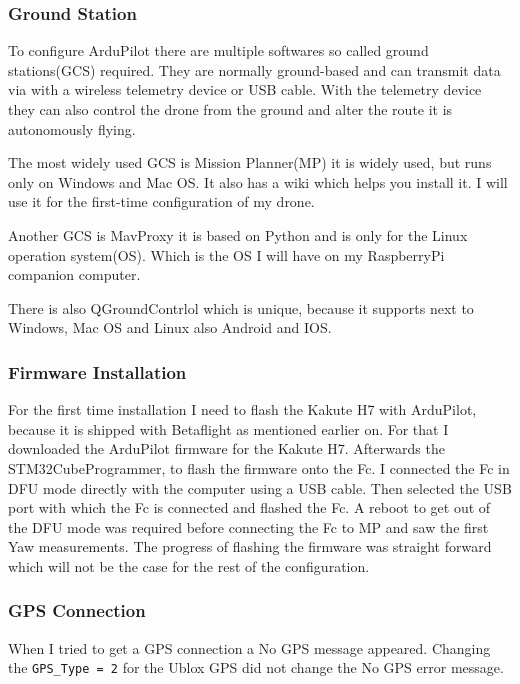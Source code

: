 \documentclass{article}
\begin{document}
	\subsubsection{Ground Station}
	To configure ArduPilot there are multiple softwares so called ground stations(GCS) required. They are normally ground-based and can transmit data via with a wireless telemetry device or USB cable.  With the telemetry device they can also control the drone from the ground and alter the route it is autonomously flying. 
	
	The most widely used GCS is Mission Planner(MP)\cite{MissionPlanner} it is widely used, but runs only on Windows and Mac OS. It also has a wiki which helps you install it. I will use it for the first-time configuration of my drone. 
	
	Another GCS is MavProxy it is based on Python and is only for the Linux operation system(OS). Which is the OS I will have on my RaspberryPi companion computer. 
	
	There is also QGroundContrlol which is unique, because it supports next to Windows, Mac OS and Linux also Android and IOS.

	\subsubsection{Firmware Installation}
	
	For the first time installation I need to flash the Kakute H7 with ArduPilot, because it is shipped with Betaflight as mentioned earlier on. For that I downloaded the ArduPilot firmware\cite{ArduPilotFirmware} for the Kakute H7. Afterwards the STM32CubeProgrammer\cite{STM32CubeProgrammer}, to flash the firmware onto the Fc. I connected the Fc in DFU mode directly with the computer using a USB cable. Then selected the USB port with which the Fc is connected and flashed the Fc. A reboot to get out of the DFU mode was required before connecting the Fc to MP and saw the first Yaw measurements. The progress of flashing the firmware was straight forward which will not be the case for the rest of the configuration. 

	\subsubsection{GPS Connection}
	When I tried to get a GPS connection a No GPS message appeared. Changing the \lstinline|GPS_Type = 2| for the Ublox GPS did not change the No GPS error message.
	
\end{document}
